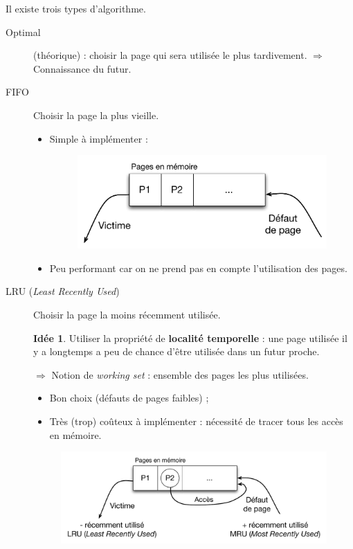 \documentclass[11pt,english,french]{scrreprt}
\theoremstyle{remark}
\theoremstyle{definition}
\newtheorem*{idee*}{Idée}
\newcommand*\Pitem{%
  \item[\color{green}\scalebox{0.9}{\textbullet}]}
\newcommand*\Citem{%
  \item[\color{red}\scalebox{0.9}{\textbullet}]}
\begin{document}
Il existe trois types d'algorithme.
\begin{description}
	\item [Optimal] (théorique) : choisir la page qui sera utilisée le plus tardivement.
	$\Rightarrow$ Connaissance du futur.
	\item [FIFO] Choisir la page la plus vieille.
	\begin{itemize}
		\Pitem Simple à implémenter :
		\begin{figure}[h!]
			\center
			\vspace{-10pt}
			\includegraphics[scale=.5]{img/pages-FIFO}
		\end{figure}
		\Citem Peu performant car on ne prend pas en compte l'utilisation des pages.
	\end{itemize}
	\item [LRU (\emph{Least Recently Used})] Choisir la page la moins récemment utilisée.
	\begin{idee*}
	Utiliser la propriété de \textbf{localité temporelle} : une page utilisée il y a longtemps a peu de chance d'être utilisée dans un futur proche.

	$\Rightarrow$ Notion de \emph{working set} : ensemble des pages les plus utilisées.
	\end{idee*}
	\begin{itemize}
	\Pitem Bon choix (défauts de pages faibles) ;
	\Citem Très (trop) coûteux à implémenter : nécessité de tracer tous les accès en mémoire.
\end{itemize}
\begin{figure}[h!]
	\center
	\vspace{-10pt}
	\includegraphics[scale=.5]{img/pages-LRU}
\end{figure} 
\end{description}
\end{document}
